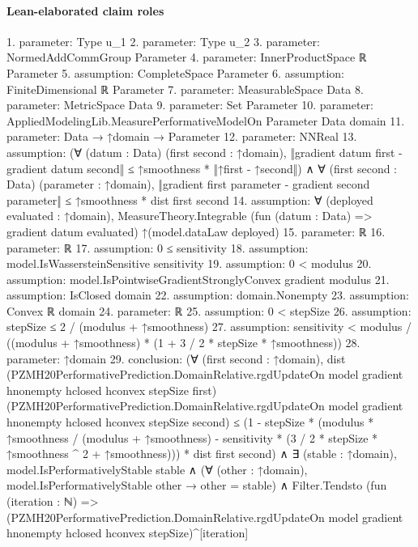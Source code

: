 \documentclass[10pt]{article}
\begin{document}
\paragraph{Lean-elaborated claim roles}\begin{ReviewVerbatim}
1. parameter: Type u_1
2. parameter: Type u_2
3. parameter: NormedAddCommGroup Parameter
4. parameter: InnerProductSpace ℝ Parameter
5. assumption: CompleteSpace Parameter
6. assumption: FiniteDimensional ℝ Parameter
7. parameter: MeasurableSpace Data
8. parameter: MetricSpace Data
9. parameter: Set Parameter
10. parameter: AppliedModelingLib.MeasurePerformativeModelOn Parameter Data domain
11. parameter: Data → ↑domain → Parameter
12. parameter: NNReal
13. assumption: (∀ (datum : Data) (first second : ↑domain),
    ‖gradient datum first - gradient datum second‖ ≤ ↑smoothness * ‖↑first - ↑second‖) ∧
  ∀ (first second : Data) (parameter : ↑domain),
    ‖gradient first parameter - gradient second parameter‖ ≤ ↑smoothness * dist first second
14. assumption: ∀ (deployed evaluated : ↑domain),
  MeasureTheory.Integrable (fun (datum : Data) => gradient datum evaluated) ↑(model.dataLaw deployed)
15. parameter: ℝ
16. parameter: ℝ
17. assumption: 0 ≤ sensitivity
18. assumption: model.IsWassersteinSensitive sensitivity
19. assumption: 0 < modulus
20. assumption: model.IsPointwiseGradientStronglyConvex gradient modulus
21. assumption: IsClosed domain
22. assumption: domain.Nonempty
23. assumption: Convex ℝ domain
24. parameter: ℝ
25. assumption: 0 < stepSize
26. assumption: stepSize ≤ 2 / (modulus + ↑smoothness)
27. assumption: sensitivity < modulus / ((modulus + ↑smoothness) * (1 + 3 / 2 * stepSize * ↑smoothness))
28. parameter: ↑domain
29. conclusion: (∀ (first second : ↑domain),
    dist
        (PZMH20PerformativePrediction.DomainRelative.rgdUpdateOn model gradient hnonempty hclosed hconvex stepSize
          first)
        (PZMH20PerformativePrediction.DomainRelative.rgdUpdateOn model gradient hnonempty hclosed hconvex stepSize
          second) ≤
      (1 -
          stepSize *
            (modulus * ↑smoothness / (modulus + ↑smoothness) -
              sensitivity * (3 / 2 * stepSize * ↑smoothness ^ 2 + ↑smoothness))) *
        dist first second) ∧
  ∃ (stable : ↑domain),
    model.IsPerformativelyStable stable ∧
      (∀ (other : ↑domain), model.IsPerformativelyStable other → other = stable) ∧
        Filter.Tendsto
            (fun (iteration : ℕ) =>
              (PZMH20PerformativePrediction.DomainRelative.rgdUpdateOn model gradient hnonempty hclosed hconvex
                    stepSize)^[iteration]

\end{ReviewVerbatim}
\end{document}
